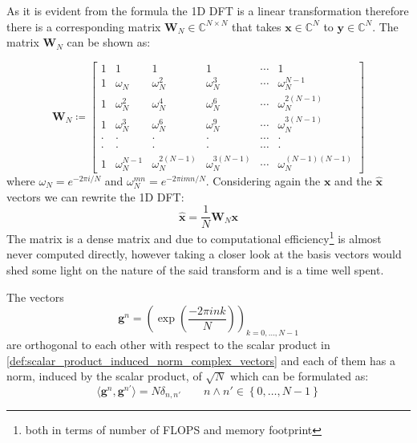 \begin{Rem}
As it is evident from the formula the 1D \ac{DFT} is a linear transformation therefore there is a corresponding matrix 
$\boldsymbol{W}_N \in \mathbb{C}^{N\times N}$ that takes $\boldsymbol{x} \in \mathbb{C}^N$ to $\boldsymbol{y} \in \mathbb{C}^N$. 
The matrix $\boldsymbol{W}_N$ can be shown as:

\begin{equation}
    \boldsymbol{W}_N \coloneqq 
    \begin{bmatrix}
        1     & 1                & 1                   & 1                   & \cdots & 1                      \\
        1     & \omega_{N}^{}    & \omega_{N}^{2}      & \omega_{N}^{3}      & \cdots & \omega_{N}^{N-1}       \\
        1     & \omega_{N}^{2}   & \omega_{N}^{4}      & \omega_{N}^{6}      & \cdots & \omega_{N}^{2(N-1)}    \\
        1     & \omega_{N}^{3}   & \omega_{N}^{6}      & \omega_{N}^{9}      & \cdots & \omega_{N}^{3(N-1)}    \\
        \cdot & \cdot            & \cdot               & \cdot               & \cdots & \cdot                  \\ 
        \cdot & \cdot            & \cdot               & \cdot               & \cdots & \cdot                  \\ 
        1     & \omega_{N}^{N-1} & \omega_{N}^{2(N-1)} & \omega_{N}^{3(N-1)} & \cdots & \omega_{N}^{(N-1)(N-1)}
        \end{bmatrix}
\end{equation}
where $\omega_N = e^{-2\pi i/N}$ and $\omega_N^{mn} = e^{-2\pi imn/N}$. Considering again the $\boldsymbol{x}$
and the $\hat {\boldsymbol{x}}$ vectors we can rewrite the 1D \ac{DFT}:
\begin{equation}
    \hat {\boldsymbol{x}} = \frac{1}{N}\boldsymbol{W}_N\boldsymbol{x}
\end{equation}
 The matrix is a dense matrix\cite{Frazier1999} and due to computational 
efficiency\footnote{both in terms of number of FLOPS and memory footprint}\cite{Frazier1999} is almost never computed directly, 
however taking a closer look at the basis vectors would shed some light on the nature of the said transform and is a 
time well spent.
\end{Rem}
\begin{Prop}\label{Prop:1ddft_vectors_orthononality}
    The vectors 
    \begin{equation}\label{eq:1ddft_vectors}
        \boldsymbol{g}^n = \left(\exp\left({\frac{-2\pi ink}{N}}\right)\right)_{k=0,\ldots,N-1}
    \end{equation}
    are orthogonal to each other with respect to the scalar product in \cref{def:scalar_product_induced_norm_complex_vectors} and 
    each of them has a norm, induced by the scalar product, of $\sqrt{N}$ which can be formulated as: 
    \begin{equation}
        \langle\boldsymbol{g}^n,\boldsymbol{g}^{n'}\rangle= N \delta_{n,n'} \qquad n \land n'\in \left\{0,\ldots,N-1\right\}
    \end{equation}
\end{Prop}

